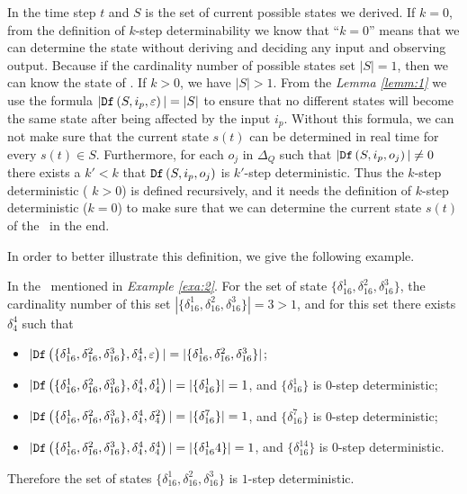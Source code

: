  In the time step $t$ and $S$ is the set of current possible states we derived. If $k=0$, from the definition of {\em$k$}-step determinability we know that ``$k=0$'' means that we can determine the state without deriving and deciding any input and observing output. Because if the cardinality number of possible states set  $|S|=1$, then we can know the state of \BCNs. If $k>0$, we have $|S|>1$. From the {\em Lemma \ref{lemm:1}} we use the formula $|{\tt Df}\left(S,i_p,\varepsilon\right)|=|S|$ to ensure that no different states will become the same state after being affected by the input $i_p$. Without this formula, we can not make sure that the current state $s(t)$ can be determined in real time for every $s(t)\in S$. Furthermore, for each $o_j$ in $\Delta_Q$ such that $|{\tt Df}\left(S,i_p,o_j\right)|\neq 0$ there exists a ${k'}<k$ that ${\tt Df}\left(S,i_p,o_j\right)$ is $k'$-step deterministic. Thus the $k$-step deterministic ( $k>0$) is defined recursively, and it needs the definition of $k$-step deterministic ($k=0$) to make sure that we can determine the current state $s(t)$ of the \BCN\ in the end. 
 
 In order to better illustrate this definition, we give the following example.
\begin{example}
In the \BCN\ mentioned in {\em Example \ref{exa:2}}. For the set of state $\{\delta_{16}^1,\delta_{16}^2,\delta_{16}^3\}$, the cardinality number of this set $|\{\delta_{16}^1,\delta_{16}^2,\delta_{16}^3\}|=3>1$, and for this set there exists $\delta_{4}^4$ such that 
 \begin{itemize}
 \item  $|{\tt Df}\left(\{\delta_{16}^1,\delta_{16}^2,\delta_{16}^3\},\delta_{4}^4,\varepsilon\right)|=|\{\delta_{16}^1,\delta_{16}^2,\delta_{16}^3\}|$;
 \item  $|{\tt Df}\left(\{\delta_{16}^1,\delta_{16}^2,\delta_{16}^3\},\delta_{4}^4,\delta_{4}^1\right)|=|\{\delta_{16}^1\}|=1$, and $\{\delta_{16}^1\}$ is $0$-step deterministic;
 \item  $|{\tt Df}\left(\{\delta_{16}^1,\delta_{16}^2,\delta_{16}^3\},\delta_{4}^4,\delta_{4}^2\right)|=|\{\delta_{16}^7\}|=1$, and $\{\delta_{16}^7\}$ is $0$-step deterministic;
  \item  $|{\tt Df}\left(\{\delta_{16}^1,\delta_{16}^2,\delta_{16}^3\},\delta_{4}^4,\delta_{4}^4\right)|=|\{\delta_{16}^14\}|=1$, and $\{\delta_{16}^14\}$ is $0$-step deterministic.
 \end{itemize}
 Therefore the set of states $\{\delta_{16}^1,\delta_{16}^2,\delta_{16}^3\}$ is $1$-step deterministic.
\end{example}  

